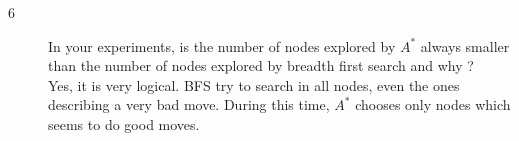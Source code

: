 \begin{description}
\item [6] In your experiments, is the number of nodes explored by $A^\ast$ always smaller than the number of nodes explored by breadth first search and why ? \\
Yes, it is very logical. BFS try to search in all nodes, even the ones describing a very bad move. During this time, $A^\ast$ chooses only nodes which seems to do good moves. 



\end{description}